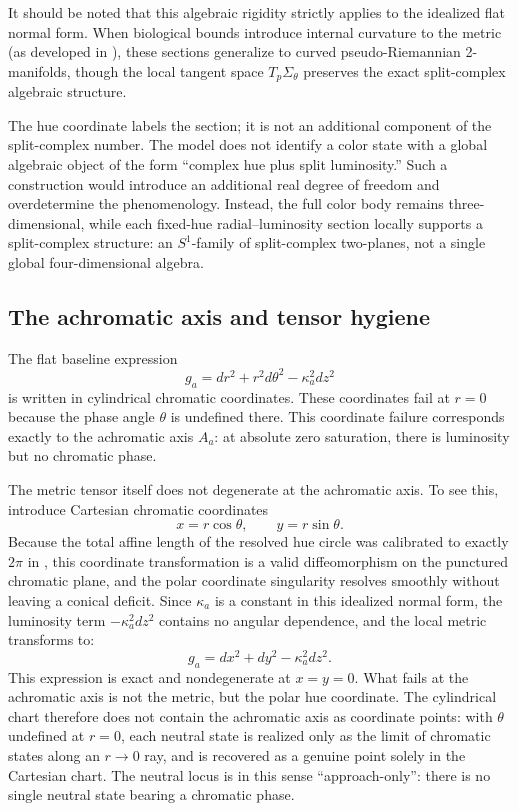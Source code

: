 \documentclass[preprint,12pt,authoryear]{elsarticle}
\theoremstyle{plain}
\theoremstyle{definition}
\theoremstyle{remark}
\begin{document}
It should be noted that this algebraic rigidity strictly applies to the idealized flat normal form. When biological bounds introduce internal curvature to the metric (as developed in ), these sections generalize to curved pseudo-Riemannian 2-manifolds, though the local tangent space $T_p\Sigma_\theta$ preserves the exact split-complex algebraic structure.

The hue coordinate labels the section; it is not an additional component of the split-complex number. The model does not identify a color state with a global algebraic object of the form ``complex hue plus split luminosity.'' Such a construction would introduce an additional real degree of freedom and overdetermine the phenomenology. Instead, the full color body remains three-dimensional, while each fixed-hue radial--luminosity section locally supports a split-complex structure: an $S^1$-family of split-complex two-planes, not a single global four-dimensional algebra.

\subsection{The achromatic axis and tensor hygiene}
\label{subsec:achromatic-axis}

\noindent The flat baseline expression
\[
g_a=dr^{2}+r^{2}d\theta^{2}-\kappa_a^{2}dz^{2}
\]
is written in cylindrical chromatic coordinates. These coordinates fail at $r=0$ because the phase angle $\theta$ is undefined there. This coordinate failure corresponds exactly to the achromatic axis $A_a$: at absolute zero saturation, there is luminosity but no chromatic phase.

The metric tensor itself does not degenerate at the achromatic axis. To see this, introduce Cartesian chromatic coordinates
\[
x=r\cos\theta,\qquad y=r\sin\theta.
\]
Because the total affine length of the resolved hue circle was calibrated to exactly $2\pi$ in , this coordinate transformation is a valid diffeomorphism on the punctured chromatic plane, and the polar coordinate singularity resolves smoothly without leaving a conical deficit. Since $\kappa_a$ is a constant in this idealized normal form, the luminosity term $-\kappa_a^2 dz^2$ contains no angular dependence, and the local metric transforms to:
\[
g_a=dx^{2}+dy^{2}-\kappa_a^{2}dz^{2}.
\]
This expression is exact and nondegenerate at $x=y=0$. What fails at the achromatic axis is not the metric, but the polar hue coordinate. The cylindrical chart therefore does not contain the achromatic axis as coordinate points: with $\theta$ undefined at $r=0$, each neutral state is realized only as the limit of chromatic states along an $r\to 0$ ray, and is recovered as a genuine point solely in the Cartesian chart. The neutral locus is in this sense ``approach-only'': there is no single neutral state bearing a chromatic phase.
\end{document}

